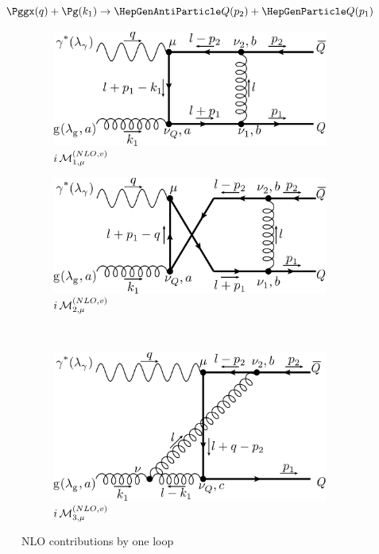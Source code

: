 \begin{equation}
\Pggx(q) + \Pg(k_1) \rightarrow \PaQ(p_2) + \PQ(p_1)
\end{equation}

\begin{figure}[ht!]
	\centering
	\begin{subfigure}[t]{.4\textwidth}
		\includegraphics[width=\textwidth]{pyfeyn/nlo-v-box1}
		\caption{$i\operatorname{\mathcal M}^{(NLO,v)}_{1,\mu}$}
	\end{subfigure}\hspace{.15\textwidth}%
	\begin{subfigure}[t]{.4\textwidth}
		\includegraphics[width=\textwidth]{pyfeyn/nlo-v-box1cr}
		\caption{$i\operatorname{\mathcal M}^{(NLO,v)}_{2,\mu}$}
	\end{subfigure}\\
	\begin{subfigure}[t]{.6\textwidth}
		\includegraphics[width=\textwidth]{pyfeyn/nlo-v-box2}
		\caption{$i\operatorname{\mathcal M}^{(NLO,v)}_{3,\mu}$}
	\end{subfigure}
	\caption{NLO contributions by one loop}\label{fig:FeynNLOvab}
\end{figure}

